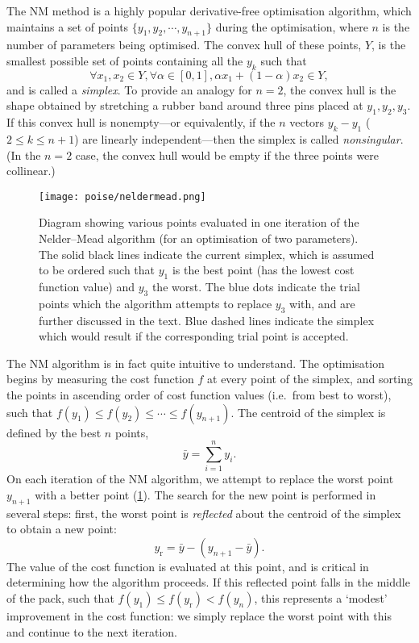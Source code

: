 The NM method is a highly popular derivative-free optimisation algorithm, which maintains a set of points $\{y_1, y_2, \cdots, y_{n+1}\}$ during the optimisation, where $n$ is the number of parameters being optimised.
The convex hull of these points, $Y$, is the smallest possible set of points containing all the $y_k$ such that
\begin{equation}
    \label{eq:convex_hull}
    \forall x_1, x_2 \in Y, \forall \alpha \in [0, 1], \alpha x_1 + (1 - \alpha) x_2 \in Y,
\end{equation}
and is called a \textit{simplex}.
To provide an analogy for $n = 2$, the convex hull is the shape obtained by stretching a rubber band around three pins placed at $y_1, y_2, y_3$.
If this convex hull is nonempty---or equivalently, if the $n$ vectors $y_k - y_1$ ($2 \leq k \leq n + 1$) are linearly independent---then the simplex is called \textit{nonsingular}.
(In the $n = 2$ case, the convex hull would be empty if the three points were collinear.)

\begin{figure}[htb]
    \centering
    \texttt{[image: poise/neldermead.png]}
    \caption[Trial points in an iteration of the Nelder--Mead algorithm]{
        Diagram showing various points evaluated in one iteration of the Nelder--Mead algorithm (for an optimisation of two parameters).
        The solid black lines indicate the current simplex, which is assumed to be ordered such that $y_1$ is the best point (has the lowest cost function value) and $y_3$ the worst.
        The blue dots indicate the trial points which the algorithm attempts to replace $y_3$ with, and are further discussed in the text.
        Blue dashed lines indicate the simplex which would result if the corresponding trial point is accepted.
    }
    \label{fig:neldermead}
\end{figure}

The NM algorithm is in fact quite intuitive to understand.
The optimisation begins by measuring the cost function $f$ at every point of the simplex, and sorting the points in ascending order of cost function values (i.e.\ from best to worst), such that $f(y_1) \leq f(y_2) \leq \cdots \leq f(y_{n+1})$.
The centroid of the simplex is defined by the best $n$ points,
\begin{equation}
    \label{eq:simplex_centroid}
    \bar{y} = \sum_{i=1}^n y_i.
\end{equation}
On each iteration of the NM algorithm, we attempt to replace the worst point $y_{n+1}$  with a better point (\cref{fig:neldermead}).
The search for the new point is performed in several steps: first, the worst point is \textit{reflected} about the centroid of the simplex to obtain a new point:
\begin{equation}
    \label{eq:nm_reflect}
    y_\text{r} = \bar{y} - (y_{n+1} - \bar{y}).
\end{equation}
The value of the cost function is evaluated at this point, and is critical in determining how the algorithm proceeds.
If this reflected point falls in the middle of the pack, such that $f(y_1) \leq f(y_\text{r}) < f(y_n)$, this represents a `modest' improvement in the cost function: we simply replace the worst point with this and continue to the next iteration.

